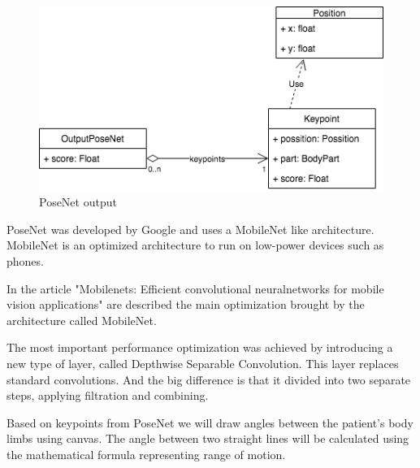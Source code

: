  \begin{figure}[htbp]
	\centerline{\includegraphics[scale=0.7]{fig/uml-posenet.png}}  
	\caption{PoseNet output}
	\label{fig:uml-posenet}
\end{figure}

PoseNet was developed by Google and uses a MobileNet like architecture.
MobileNet is an optimized architecture to run on low-power devices such as phones.

In the article "Mobilenets: Efficient convolutional neuralnetworks for mobile vision applications"  \cite{DBLP:journals/corr/HowardZCKWWAA17} are described the main optimization brought by the architecture called MobileNet.

The most important performance optimization was achieved by introducing a new type of layer, called Depthwise Separable Convolution. This layer replaces standard convolutions. And the big difference is that it divided into two separate steps, applying filtration and combining.

Based on keypoints from PoseNet we will draw angles between the patient's body limbs using canvas.
The angle between two straight lines will be calculated using the mathematical formula representing range of motion.

